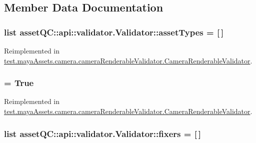 \subsection{\-Member \-Data \-Documentation}
\hypertarget{classassetQC_1_1api_1_1validator_1_1Validator_a729f873c0bd4e416f41dc9a9ea51b8de}{
\subsubsection[{asset\-Types}]{\setlength{\rightskip}{0pt plus 5cm}list {\bf asset\-Q\-C\-::api\-::validator.\-Validator\-::asset\-Types} = \mbox{[}$\,$\mbox{]}}}\label{d6/d00/classassetQC_1_1api_1_1validator_1_1Validator_a729f873c0bd4e416f41dc9a9ea51b8de}


\-Reimplemented in \hyperlink{classtest_1_1mayaAssets_1_1camera_1_1cameraRenderableValidator_1_1CameraRenderableValidator_a877d47beb782cca75835d31c4b8b154b}{test.\-maya\-Assets.\-camera.\-camera\-Renderable\-Validator.\-Camera\-Renderable\-Validator}.

\hypertarget{classassetQC_1_1api_1_1validator_1_1Validator_aa536365d26b1b7cc540e979f5bfaecbc}{
\subsubsection[{enable}]{ = \-True}}\label{d6/d00/classassetQC_1_1api_1_1validator_1_1Validator_aa536365d26b1b7cc540e979f5bfaecbc}


\-Reimplemented in \hyperlink{classtest_1_1mayaAssets_1_1camera_1_1cameraRenderableValidator_1_1CameraRenderableValidator_ac729f77625485ef1bd4a5aadbc274eb1}{test.\-maya\-Assets.\-camera.\-camera\-Renderable\-Validator.\-Camera\-Renderable\-Validator}.

\hypertarget{classassetQC_1_1api_1_1validator_1_1Validator_a4cc8fea6a18bf60b0cc7a6a23c211850}{
\subsubsection[{fixers}]{\setlength{\rightskip}{0pt plus 5cm}list {\bf asset\-Q\-C\-::api\-::validator.\-Validator\-::fixers} = \mbox{[}$\,$\mbox{]}}}\label{d6/d00/classassetQC_1_1api_1_1validator_1_1Validator_a4cc8fea6a18bf60b0cc7a6a23c211850}


